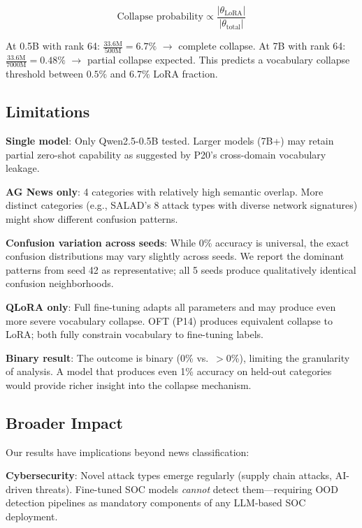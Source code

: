 \documentclass[journal]{IEEEtran}
\begin{document}
\begin{equation}
\text{Collapse probability} \propto \frac{|\theta_\text{LoRA}|}{|\theta_\text{total}|}
\end{equation}

At 0.5B with rank 64: $\frac{33.6\text{M}}{500\text{M}} = 6.7\%$ $\to$ complete collapse. At 7B with rank 64: $\frac{33.6\text{M}}{7000\text{M}} = 0.48\%$ $\to$ partial collapse expected. This predicts a vocabulary collapse threshold between $0.5\%$ and $6.7\%$ LoRA fraction.

\subsection{Limitations}
\textbf{Single model}: Only Qwen2.5-0.5B tested. Larger models (7B+) may retain partial zero-shot capability as suggested by P20's cross-domain vocabulary leakage.

\textbf{AG News only}: 4 categories with relatively high semantic overlap. More distinct categories (e.g., SALAD's 8 attack types with diverse network signatures) might show different confusion patterns.

\textbf{Confusion variation across seeds}: While 0\% accuracy is universal, the exact confusion distributions may vary slightly across seeds. We report the dominant patterns from seed 42 as representative; all 5 seeds produce qualitatively identical confusion neighborhoods.

\textbf{QLoRA only}: Full fine-tuning adapts all parameters and may produce even more severe vocabulary collapse. OFT (P14) produces equivalent collapse to LoRA; both fully constrain vocabulary to fine-tuning labels.

\textbf{Binary result}: The outcome is binary (0\% vs.\ $>$0\%), limiting the granularity of analysis. A model that produces even 1\% accuracy on held-out categories would provide richer insight into the collapse mechanism.

\subsection{Broader Impact}
Our results have implications beyond news classification:

\textbf{Cybersecurity}: Novel attack types emerge regularly (supply chain attacks, AI-driven threats). Fine-tuned SOC models \emph{cannot} detect them---requiring OOD detection pipelines as mandatory components of any LLM-based SOC deployment.
\end{document}
